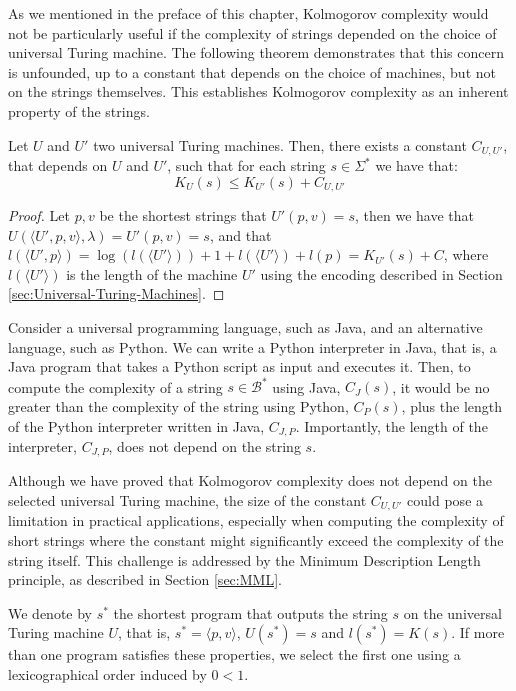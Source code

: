 As we mentioned in the preface of this chapter, Kolmogorov complexity would not be particularly useful if the complexity of strings depended on the choice of universal Turing machine. The following theorem demonstrates that this concern is unfounded, up to a constant that depends on the choice of machines, but not on the strings themselves. This establishes Kolmogorov complexity as an inherent property of the strings.

\begin{theorem}
\label{def:Invariance-theorem}
Let $U$ and $U'$ two universal Turing machines. Then, there exists a constant $C_{U, U'}$, that depends on $U$ and $U'$, such that for each string $s \in \Sigma^{\ast}$ we have that:
\[
K_{U}(s) \leq K_{U'}(s) + C_{U, U'}
\]
\end{theorem}
\begin{proof}
Let $p, v$ be the shortest strings that $U'(p,v)=s$, then we have that $U(\langle U',p, v \rangle, \lambda) = U'(p, v) = s$, and that $l(\langle U',p \rangle) = \log(l(\langle U' \rangle)) + 1 + l(\langle U' \rangle) + l(p) = K_{U'}(s) + C$, where $l(\langle U' \rangle)$ is the length of the machine $U'$ using the encoding described in Section \ref{sec:Universal-Turing-Machines}.
\end{proof}

\begin{example}
Consider a universal programming language, such as Java, and an alternative language, such as Python. We can write a Python interpreter in Java, that is, a Java program that takes a Python script as input and executes it. Then, to compute the complexity of a string $s \in \mathcal{B}^\ast$ using Java, $C_J(s)$, it would be no greater than the complexity of the string using Python, $C_P(s)$, plus the length of the Python interpreter written in Java, $C_{J,P}$. Importantly, the length of the interpreter, $C_{J,P}$, does not depend on the string $s$.
\end{example}

Although we have proved that Kolmogorov complexity does not depend on the selected universal Turing machine, the size of the constant \(C_{U, U'}\) could pose a limitation in practical applications, especially when computing the complexity of short strings where the constant might significantly exceed the complexity of the string itself. This challenge is addressed by the Minimum Description Length principle, as described in Section \ref{sec:MML}.

\begin{notation}
We denote by \(s^\ast\) the shortest program that outputs the string \(s\) on the universal Turing machine \(U\), that is, \(s^\ast = \langle p,v \rangle\), \(U(s^\ast) = s\) and \(l(s^\ast) = K(s)\). If more than one program satisfies these properties, we select the first one using a lexicographical order induced by \(0 < 1\).
\end{notation}

